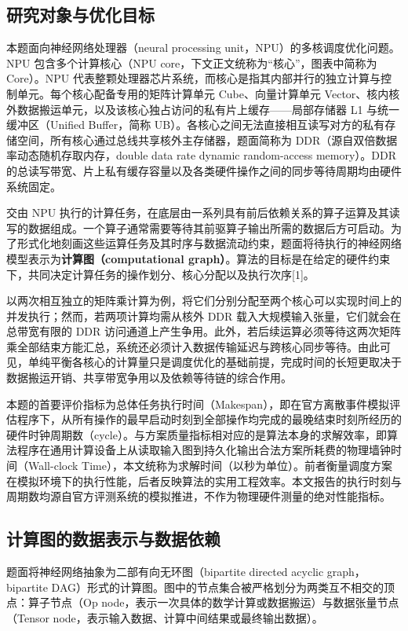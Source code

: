 \documentclass[anonymous,notoc]{gmcm2026}
\begin{document}
\subsection{研究对象与优化目标}

本题面向神经网络处理器（neural processing unit，NPU）的多核调度优化问题。NPU 包含多个计算核心（NPU core，下文正文统称为``核心''，图表中简称为 Core）。NPU 代表整颗处理器芯片系统，而核心是指其内部并行的独立计算与控制单元。每个核心配备专用的矩阵计算单元 Cube、向量计算单元 Vector、核内核外数据搬运单元，以及该核心独占访问的私有片上缓存------局部存储器 L1 与统一缓冲区（Unified Buffer，简称 UB）。各核心之间无法直接相互读写对方的私有存储空间，所有核心通过总线共享核外主存储器，题面简称为 DDR（源自双倍数据率动态随机存取内存，double data rate dynamic random-access memory）。DDR 的总读写带宽、片上私有缓存容量以及各类硬件操作之间的同步等待周期均由硬件系统固定。

交由 NPU 执行的计算任务，在底层由一系列具有前后依赖关系的算子运算及其读写的数据组成。一个算子通常需要等待其前驱算子输出所需的数据后方可启动。为了形式化地刻画这些运算任务及其时序与数据流动约束，题面将待执行的神经网络模型表示为\textbf{计算图（computational graph）}。算法的目标是在给定的硬件约束下，共同决定计算任务的操作划分、核心分配以及执行次序{[}1{]}。

以两次相互独立的矩阵乘计算为例，将它们分别分配至两个核心可以实现时间上的并发执行；然而，若两项计算均需从核外 DDR 载入大规模输入张量，它们就会在总带宽有限的 DDR 访问通道上产生争用。此外，若后续运算必须等待这两次矩阵乘全部结束方能汇总，系统还必须计入数据传输延迟与跨核心同步等待。由此可见，单纯平衡各核心的计算量只是调度优化的基础前提，完成时间的长短更取决于数据搬运开销、共享带宽争用以及依赖等待链的综合作用。

本题的首要评价指标为总体任务执行时间（Makespan），即在官方离散事件模拟评估程序下，从所有操作的最早启动时刻到全部操作均完成的最晚结束时刻所经历的硬件时钟周期数（cycle）。与方案质量指标相对应的是算法本身的求解效率，即算法程序在通用计算设备上从读取输入图到持久化输出合法方案所耗费的物理墙钟时间（Wall-clock Time），本文统称为求解时间（以秒为单位）。前者衡量调度方案在模拟环境下的执行性能，后者反映算法的实用工程效率。本文报告的执行时刻与周期数均源自官方评测系统的模拟推进，不作为物理硬件测量的绝对性能指标。

\subsection{计算图的数据表示与数据依赖}

题面将神经网络抽象为二部有向无环图（bipartite directed acyclic graph，bipartite DAG）形式的计算图。图中的节点集合被严格划分为两类互不相交的顶点：算子节点（Op node，表示一次具体的数学计算或数据搬运）与数据张量节点（Tensor node，表示输入数据、计算中间结果或最终输出数据）。
\end{document}
